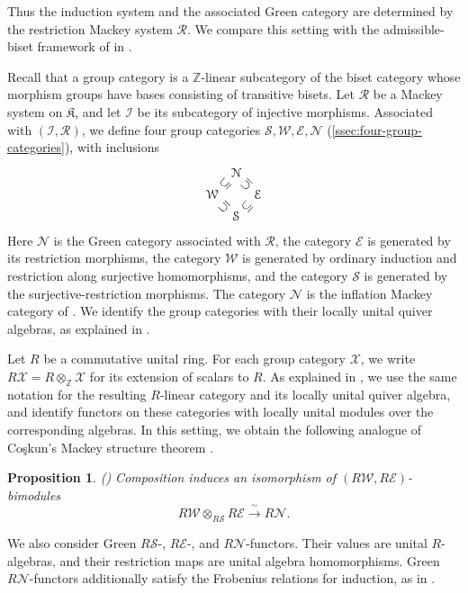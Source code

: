 \documentclass{amsart}
\numberwithin{equation}{section}%
\newtheorem{Prop}[equation]{Proposition}
\theoremstyle{remark}
\theoremstyle{definition}
\begin{document}
Thus the induction system and the associated Green category are
determined by the restriction Mackey system $\mathcal R$.
We compare this setting with the admissible-biset framework of
\cite{BoltjeRaggiCardenasValeroElizondo19} in
.

Recall that a group category is a $\mathbb Z$-linear subcategory
of the biset category whose morphism groups have bases consisting
of transitive bisets. Let $\mathcal R$ be a Mackey system on $\mathfrak K$, and let
$\mathcal I$ be its subcategory of injective morphisms. 
Associated with $(\mathcal I, \mathcal R)$, we define four group
categories $\mathcal S,\mathcal W,\mathcal E,\mathcal N$ 
(\cref{ssec:four-group-categories}), with
inclusions 
%
\[
\xymatrix@C=1ex@R=1ex{
	& \mathcal N & \\
	\mathcal W \ar@{}[ur]|-{\rotatebox{45}{$\subseteq$}}
	&& \mathcal E \ar@{}[ul]|-{\rotatebox{135}{$\subseteq$}}\\
	& \mathcal S  \ar@{}[ul]|-{\rotatebox{135}{$\subseteq$}} \ar@{}[ur]|-{\rotatebox{45}{$\subseteq$}} &
}
\]
%
Here $\mathcal N$ is the Green category associated with
$\mathcal R$,  the category $\mathcal E$ is generated by its restriction morphisms,
the category $\mathcal W$ is generated by ordinary induction and restriction
along surjective homomorphisms, and the category $\mathcal S$ is generated by
the surjective-restriction morphisms. The category
$\mathcal N$ is the inflation Mackey category of
\cite{Barker16a}. We identify the group categories with their locally unital
quiver algebras, as explained in .

Let $R$ be a commutative unital ring.
For each group category $\mathcal X$, we write
$R\mathcal X=R\otimes_{\mathbb Z}\mathcal X$
for its extension of scalars to $R$.
As explained in , we use the same
notation for the resulting $R$-linear category and its locally
unital quiver algebra, and identify functors on these categories
with locally unital modules over the corresponding algebras.
In this setting, we obtain the following analogue
of Co\c{s}kun's Mackey structure theorem
\cite[Thm.~3.2]{Coskun07}.
%
\begin{Prop}()
\label{prop:intro-bimodule-decomposition}
Composition induces an isomorphism of
$(R\mathcal W,R\mathcal E)$-bimodules
\[
R\mathcal W\otimes_{R\mathcal S}R\mathcal E
\xrightarrow{\ \sim\ } R\mathcal N.
\]
\end{Prop}
%
We also consider Green $R\mathcal S$-,
$R\mathcal E$-, and $R\mathcal N$-functors.
Their values are unital $R$-algebras, and their
restriction maps are unital algebra homomorphisms.
Green $R\mathcal N$-functors additionally satisfy
the Frobenius relations for induction, as in
\cite{Barker16b}.
\end{document}

